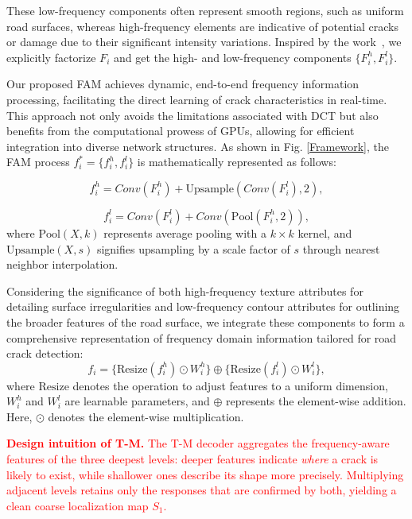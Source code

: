 \documentclass[journal]{IEEEtran}
\begin{document}
These low-frequency components often represent smooth regions, such as uniform road surfaces, whereas high-frequency elements are indicative of potential cracks or damage due to their significant intensity variations. Inspired by the work~\cite{DBLP:conf/iccv/Chen0XYKRYF19}, we explicitly factorize $F_i$ and get the high- and low-frequency components $\{F_i^h,F_i^l\}$.

Our proposed FAM achieves dynamic, end-to-end frequency information processing, facilitating the direct learning of crack characteristics in real-time. This approach not only avoids the limitations associated with DCT but also benefits from the computational prowess of GPUs, allowing for efficient integration into diverse network structures. As shown in Fig. \ref{Framework}, the FAM process $f^*_{i} = \{f^{h}_{i},f^{l}_{i}\}$ is mathematically represented as follows:

\begin{equation}
f^{h}_{i} = Conv(F^{h}_{i}) + \text{Upsample}(Conv(F^{l}_{i}), 2),
\end{equation}

\begin{equation}
f^{l}_{i} = Conv(F^{l}_{i}) + Conv(\text{Pool}(F^{h}_{i}, 2)),
\end{equation}
where $\text{Pool}(X, k)$ represents average pooling with a $k \times k$ kernel, and $\text{Upsample}(X, s)$ signifies upsampling by a scale factor of $s$ through nearest neighbor interpolation. 

Considering the significance of both high-frequency texture attributes for detailing surface irregularities and low-frequency contour attributes for outlining the broader features of the road surface, we integrate these components to form a comprehensive representation of frequency domain information tailored for road crack detection:
\begin{equation}
f_i = \{ \text{Resize}(f^{h}_{i}) \odot W^{h}_{i} \} \oplus  \{ \text{Resize}(f^{l}_{i})  \odot W^{l}_{i}  
 \},
\end{equation}
where $\text{Resize}$ denotes the operation to adjust features to a uniform dimension, $W^{h}_{i}$ and $W^{l}_{i}$ are learnable parameters, and $\oplus$ represents the element-wise addition. 
Here, $\odot$ denotes the element-wise multiplication.


\textcolor{red}{\textbf{Design intuition of T-M.} The T-M decoder aggregates the frequency-aware features of the three deepest levels: deeper features indicate \emph{where} a crack is likely to exist, while shallower ones describe its shape more precisely. Multiplying adjacent levels retains only the responses that are confirmed by both, yielding a clean coarse localization map $S_1$.}
\end{document}
